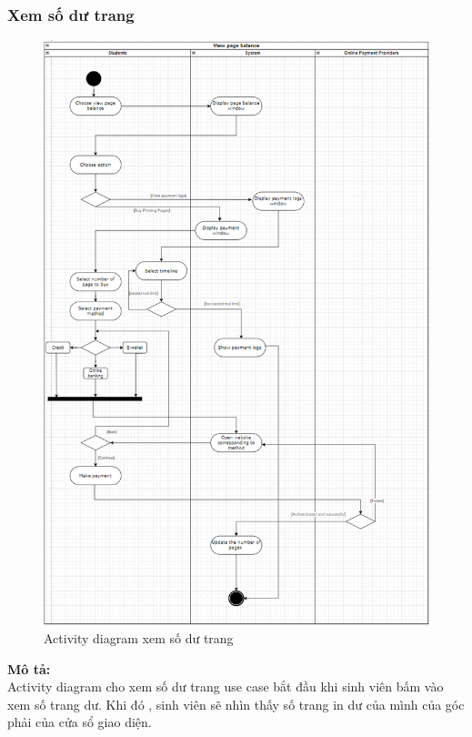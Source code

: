\documentclass[a4paper]{article}
\begin{document}
\subsubsection{Xem số dư trang}
\begin{figure}[h!]
\begin{center}
\includegraphics[width=12cm]{picture/Activity_diagram_view page blance.png}
\caption{Activity diagram xem số dư trang}
\end{center}
\end{figure}
\newpage
\noindent \textbf{Mô tả:}\\
\noindent Activity diagram cho xem số dư trang use case bắt đầu khi sinh viên bấm vào xem số trang dư. Khi đó , sinh viên sẽ nhìn thấy số trang in dư của mình của góc phải của cửa sổ giao diện.
\end{document}
